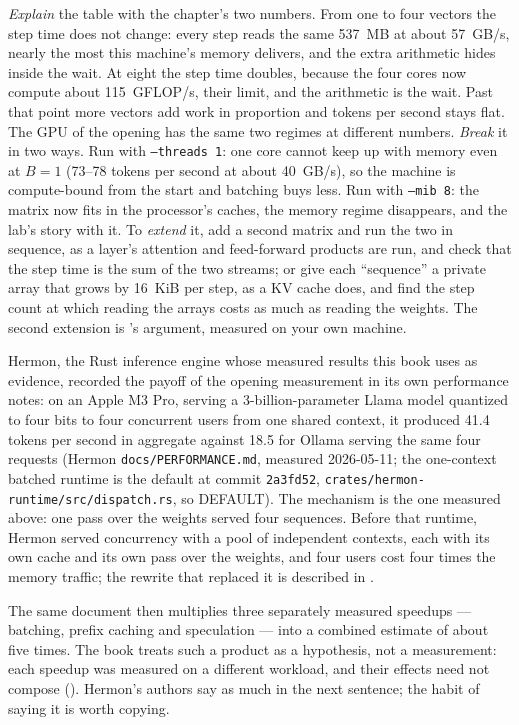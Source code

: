 \emph{Explain} the table with the chapter's two numbers. From one to four
vectors the step time does not change: every step reads the same 537~MB at
about 57~GB/s, nearly the most this machine's memory delivers, and the extra
arithmetic hides inside the wait. At eight the step time doubles, because the
four cores now compute about 115~GFLOP/s, their limit, and the arithmetic is
the wait. Past that point more vectors add work in proportion and tokens per
second stays flat. The GPU of the opening has the same two regimes at different
numbers. \emph{Break} it in two ways. Run with \texttt{--threads 1}: one core
cannot keep up with memory even at $B = 1$ (73--78 tokens per second at about
40~GB/s), so the machine is compute-bound from the start and batching buys less.
Run with \texttt{--mib 8}: the matrix now fits in the processor's caches, the
memory regime disappears, and the lab's story with it. To \emph{extend} it, add
a second matrix and run the two in sequence, as a layer's attention and
feed-forward products are run, and check that the step time is the sum of the
two streams; or give each ``sequence'' a private array that grows by 16~KiB per
step, as a KV cache does, and find the step count at which reading the arrays
costs as much as reading the weights. The second extension is
's argument, measured on your own machine.


Hermon, the Rust inference engine whose measured results this book uses as
evidence, recorded the payoff of the opening measurement in its own
performance notes: on an Apple M3 Pro, serving a 3-billion-parameter Llama
model quantized to four bits to four concurrent users from one shared
context, it produced 41.4 tokens per second in aggregate
against 18.5 for Ollama serving the same four requests (Hermon
\texttt{docs/PERFORMANCE.md}, measured 2026-05-11; the one-context batched
runtime is the default at commit \texttt{2a3fd52},
\texttt{crates/hermon-runtime/src/dispatch.rs}, so DEFAULT). The
mechanism is the one measured above: one pass over the weights served four
sequences. Before that runtime, Hermon served concurrency with a pool of
independent contexts, each with its own cache and its own pass over the
weights, and four users cost four times the memory traffic; the rewrite that
replaced it is described in .

The same document then multiplies three separately measured speedups ---
batching, prefix caching and speculation --- into a combined estimate of about
five times. The book treats such a product as a hypothesis, not a
measurement: each speedup was measured on a different workload, and their
effects need not compose (). Hermon's authors say as
much in the next sentence; the habit of saying it is worth copying.

